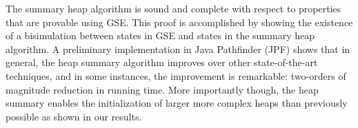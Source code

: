 


\begin{comment}
In
practical terms, any property that can be proved using GSE can also be
proved using summary heaps, and, any property proved by
summary heaps can also be proved by GSE. Of course, both require a
bound on heap reference chains and loops.
\end{comment}


The summary heap algorithm is sound and complete with respect to
properties that are provable using GSE. This proof is accomplished by
showing the existence of a bisimulation between states in GSE and
states in the summary heap algorithm.  A preliminary implementation in
Java Pathfinder (JPF) shows that in general, the heap summary
algorithm improves over other state-of-the-art techniques, and in some
instances, the improvement is remarkable: two-orders of magnitude
reduction in running time. More importantly though, the heap summary
enables the initialization of larger more complex heaps than
previously possible as shown in our results.



\begin{comment}
We implement the summary heap algorithm as an extension to \emph{Java
  PathFinder} (JPF) and compare it to GSE with lazy initialization in
\emph{Symbolic Pathfinder (SPF)} and an implementation of Lazier\#
initialization in SPF.  The comparison shows on some examples up to a two-order of magnitude
reduction in the total time taken to explore the same state space
defined by the bound on the longest heap reference chain.  For these
examples, we show that where other GSE approaches are unable to
complete exploration within the provided time bound, the summary heap
finishes exploration in a few seconds.
\end{comment}

